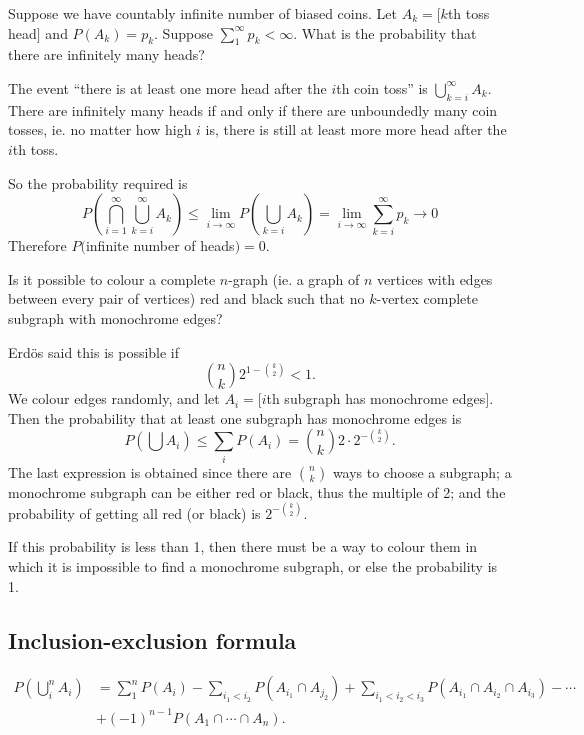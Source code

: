 \documentclass[a4paper]{article}
\begin{document}
\begin{eg}
  Suppose we have countably infinite number of biased coins. Let $A_k = [k$th toss head$]$ and $P(A_k) = p_k$. Suppose $\sum_1^\infty p_k < \infty$. What is the probability that there are infinitely many heads?

  The event ``there is at least one more head after the $i$th coin toss'' is $\bigcup_{k = i}^\infty A_k$. There are infinitely many heads if and only if there are unboundedly many coin tosses, ie. no matter how high $i$ is, there is still at least more more head after the $i$th toss.

  So the probability required is
  \[
    P\left(\bigcap_{i = 1}^\infty\bigcup _{k = i}^\infty A_k\right) \leq \lim_{i \to \infty} P\left(\bigcup_{k = i}A_k\right)= \lim_{i\to \infty}\sum_{k = i}^\infty p_k \to 0
  \]
  Therefore $P($infinite number of heads$) = 0$.
\end{eg}

\begin{eg}[Erdos 1947]
  Is it possible to colour a complete $n$-graph (ie. a graph of $n$ vertices with edges between every pair of vertices) red and black such that no $k$-vertex complete subgraph with monochrome edges?

  Erd\"os said this is possible if
  \[
    \binom{n}{k} 2^{1 - \binom{k}{2}} < 1.
  \]
  We colour edges randomly, and let $A_i=[i$th subgraph has monochrome edges$]$. Then the probability that at least one subgraph has monochrome edges is
  \[
    P\left(\bigcup A_i\right) \leq \sum_i P(A_i) = \binom{n}{k} 2\cdot 2^{-\binom{k}{2}}.
  \]
  The last expression is obtained since there are $\binom{n}{k}$ ways to choose a subgraph; a monochrome subgraph can be either red or black, thus the multiple of 2; and the probability of getting all red (or black) is $2^{-\binom{k}{2}}$.

  If this probability is less than 1, then there must be a way to colour them in which it is impossible to find a monochrome subgraph, or else the probability is 1.
\end{eg}

\subsection{Inclusion-exclusion formula}
\begin{thm}
  \begin{align*}
    P\left(\bigcup_i^n A_i\right) &= \sum_1^n P(A_i) - \sum_{i_1 < i_2} P(A_{i_1}\cap A_{j_2}) + \sum_{i_1 < i_2 < i_3}P(A_{i_1}\cap A_{i_2} \cap A_{i_3}) - \cdots\\
    &+ (-1)^{n - 1} P(A_1\cap \cdots \cap A_n).
  \end{align*}
\end{thm}
\end{document}
